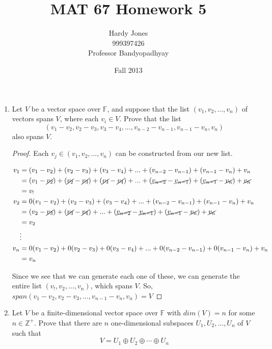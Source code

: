 \documentclass[12pt,letterpaper]{article}
\title{MAT 67 Homework 5\vspace{-2ex}}
\author{Hardy Jones\\
        999397426\\
        Professor Bandyopadhyay\vspace{-2ex}}
\date{Fall 2013}
\begin{document}
  \maketitle

  \begin{enumerate}
    \item
      Let $V$ be a vector space over $\mathbb{F}$,
      and suppose that the list $(v_1, v_2, ..., v_n)$ of vectors spans $V$,
      where each $v_i \in V$.
      Prove that the list 
      \[(v_1 - v_2, v_2 - v_3, v_3 - v_4, ..., v_{n-2} - v_{n-1}, v_{n-1} - v_n, v_n)\]
      also spans $V$.

      \begin{proof}
        Each $v_j \in (v_1, v_2, ..., v_n)$ can be constructed from our new list.

        \begin{align*}
          v_1 &= (v_1 - v_2) + (v_2 - v_3) + (v_3 - v_4) + ... + (v_{n-2} - v_{n-1}) + (v_{n-1} - v_n) + v_n \\
          &= (v_1 - \cancel{v_2}) + (\cancel{v_2} - \cancel{v_3}) + (\cancel{v_3} - \cancel{v_4}) + ... + (\cancel{v_{n-2}} - \cancel{v_{n-1}}) + (\cancel{v_{n-1}} - \cancel{v_n}) + \cancel{v_n} \\
          &= v_! \\
          v_2 &= 0(v_1 - v_2) + (v_2 - v_3) + (v_3 - v_4) + ... + (v_{n-2} - v_{n-1}) + (v_{n-1} - v_n) + v_n \\
          &= (v_2 - \cancel{v_3}) + (\cancel{v_3} - \cancel{v_4}) + ... + (\cancel{v_{n-2}} - \cancel{v_{n-1}}) + (\cancel{v_{n-1}} - \cancel{v_n}) + \cancel{v_n} \\
          &= v_2 \\
          &\vdots \\
          v_n &= 0(v_1 - v_2) + 0(v_2 - v_3) + 0(v_3 - v_4) + ... + 0(v_{n-2} - v_{n-1}) + 0(v_{n-1} - v_n) + v_n \\
          &= v_n
        \end{align*}

        Since we see that we can generate each one of these,
        we can generate the entire list $(v_!, v_2, ..., v_n)$, which spans $V$.
        So, $span(v_1 - v_2, v_2 - v_3, ..., v_{n-1}- v_n, v_n) = V$
      \end{proof}

    \pagebreak

    \item
      Let $V$ be a finite-dimensional vector space over $\mathbb{F}$
      with $dim(V) = n$ for some $n \in \mathbb{Z}^+$.
      Prove that there are $n$ one-dimensional subspaces $U_1, U_2, ..., U_n$ of $V$ such that
      \[V = U_1 \oplus U_2 \oplus \cdots \oplus U_n\]


\end{enumerate}
\end{document}
